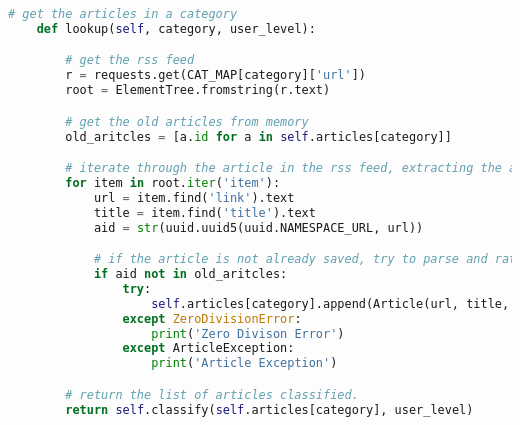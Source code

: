 \begin{lstlisting}[caption={[Article Discovery Code] Python code for obtaining news articles from the \textit{Google News} RSS feeds.}, label=lst:disc, language=python, float=h]
    # get the articles in a category
    def lookup(self, category, user_level):

        # get the rss feed
        r = requests.get(CAT_MAP[category]['url'])
        root = ElementTree.fromstring(r.text)

        # get the old articles from memory
        old_aritcles = [a.id for a in self.articles[category]]

        # iterate through the article in the rss feed, extracting the articles
        for item in root.iter('item'):
            url = item.find('link').text
            title = item.find('title').text
            aid = str(uuid.uuid5(uuid.NAMESPACE_URL, url))

            # if the article is not already saved, try to parse and rate it (some articles fail)
            if aid not in old_aritcles:
                try:
                    self.articles[category].append(Article(url, title, aid, category))
                except ZeroDivisionError:
                    print('Zero Divison Error')
                except ArticleException:
                    print('Article Exception')

        # return the list of articles classified.
        return self.classify(self.articles[category], user_level)
\end{lstlisting}
